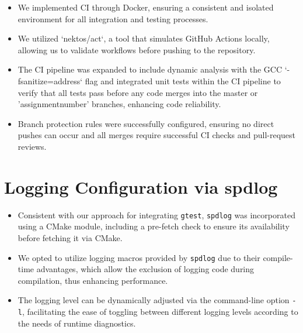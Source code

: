 \documentclass{article}
\begin{document}
\begin{itemize}
    \item We implemented CI through Docker, ensuring a consistent and isolated environment for all integration and testing processes.
    \item We utilized `nektos/act`, a tool that simulates GitHub Actions locally, allowing us to validate workflows before pushing to the repository.
    \item The CI pipeline was expanded to include dynamic analysis with the GCC `-fsanitize=address` flag and integrated unit tests within the CI pipeline to verify that all tests pass before any code merges into the master or 'assignment{number}' branches, enhancing code reliability.
    \item Branch protection rules were successfully configured, ensuring no direct pushes can occur and all merges require successful CI checks and pull-request reviews.
\end{itemize}

\section{Logging Configuration via spdlog}

\begin{itemize}
    \item Consistent with our approach for integrating \verb|gtest|, \verb|spdlog| was incorporated using a CMake module, including a pre-fetch check to ensure its availability before fetching it via CMake.
    \item We opted to utilize logging macros provided by \verb|spdlog| due to their compile-time advantages, which allow the exclusion of logging code during compilation, thus enhancing performance.
    \item The logging level can be dynamically adjusted via the command-line option \texttt{-l}, facilitating the ease of toggling between different logging levels according to the needs of runtime diagnostics.
\end{itemize}
\end{document}
